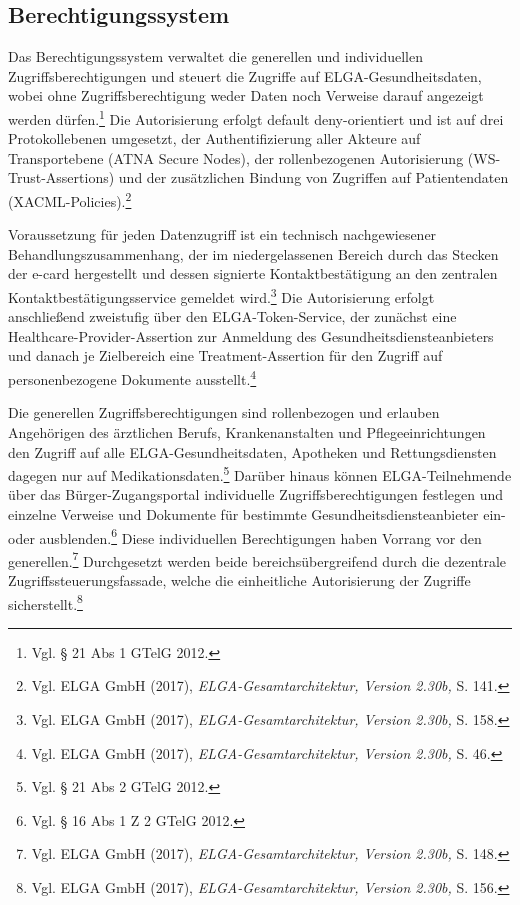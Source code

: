     \subsection{Berechtigungssystem}
Das Berechtigungssystem verwaltet die generellen und individuellen Zugriffsberechtigungen und steuert die Zugriffe auf ELGA-Gesundheitsdaten, wobei ohne Zugriffsberechtigung weder Daten noch Verweise darauf angezeigt werden dürfen.\footnote{Vgl. § 21 Abs 1 GTelG 2012.} Die Autorisierung erfolgt default deny-orientiert und ist auf drei Protokollebenen umgesetzt, der Authentifizierung aller Akteure auf Transportebene (ATNA Secure Nodes), der rollenbezogenen Autorisierung (WS-Trust-Assertions) und der zusätzlichen Bindung von Zugriffen auf Patientendaten (XACML-Policies).\footnote{Vgl.  ELGA GmbH (2017), \textit{ELGA-Gesamtarchitektur, Version 2.30b,} S. 141.}

Voraussetzung für jeden Datenzugriff ist ein technisch nachgewiesener Behandlungszusammenhang, der im niedergelassenen Bereich durch das Stecken der e-card hergestellt und dessen signierte Kontaktbestätigung an den zentralen Kontaktbestätigungsservice gemeldet wird.\footnote{Vgl.  ELGA GmbH (2017), \textit{ELGA-Gesamtarchitektur, Version 2.30b,} S. 158.} Die Autorisierung erfolgt anschließend zweistufig über den ELGA-Token-Service, der zunächst eine Healthcare-Provider-Assertion zur Anmeldung des Gesundheitsdiensteanbieters und danach je Zielbereich eine Treatment-Assertion für den Zugriff auf personenbezogene Dokumente ausstellt.\footnote{Vgl.  ELGA GmbH (2017), \textit{ELGA-Gesamtarchitektur, Version 2.30b,} S. 46.}

Die generellen Zugriffsberechtigungen sind rollenbezogen und erlauben Angehörigen des ärztlichen Berufs, Krankenanstalten und Pflegeeinrichtungen den Zugriff auf alle ELGA-Gesundheitsdaten, Apotheken und Rettungsdiensten dagegen nur auf Medikationsdaten.\footnote{Vgl. § 21 Abs 2 GTelG 2012.} Darüber hinaus können ELGA-Teilnehmende über das Bürger-Zugangsportal individuelle Zugriffsberechtigungen festlegen und einzelne Verweise und Dokumente für bestimmte Gesundheitsdiensteanbieter ein- oder ausblenden.\footnote{Vgl. § 16 Abs 1 Z 2 GTelG 2012.} Diese individuellen Berechtigungen haben Vorrang vor den generellen.\footnote{Vgl.  ELGA GmbH (2017), \textit{ELGA-Gesamtarchitektur, Version 2.30b,} S. 148.} Durchgesetzt werden beide bereichsübergreifend durch die dezentrale Zugriffssteuerungsfassade, welche die einheitliche Autorisierung der Zugriffe sicherstellt.\footnote{Vgl.  ELGA GmbH (2017), \textit{ELGA-Gesamtarchitektur, Version 2.30b,} S. 156.}

